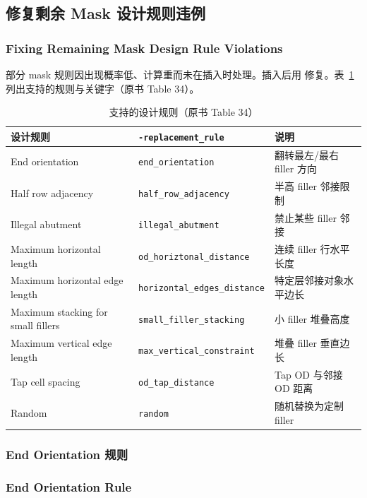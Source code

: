 \subsection{修复剩余 Mask 设计规则违例}
\subsubsection*{Fixing Remaining Mask Design Rule Violations}

部分 mask 规则因出现概率低、计算重而未在插入时处理。插入后用  修复。表~\ref{tab:replace-fillers-rules} 列出支持的规则与关键字（原书 Table 34）。

\begin{table}[htbp]
\centering
\caption{ 支持的设计规则（原书 Table 34）}
\label{tab:replace-fillers-rules}
\begin{tabular}{@{}llp{}@{}}
\toprule
设计规则 & \texttt{-replacement\_rule} & 说明 \\
\midrule
End orientation & \texttt{end\_orientation} & 翻转最左/最右 filler 方向 \\
Half row adjacency & \texttt{half\_row\_adjacency} & 半高 filler 邻接限制 \\
Illegal abutment & \texttt{illegal\_abutment} & 禁止某些 filler 邻接 \\
Maximum horizontal length & \texttt{od\_horiztonal\_distance} & 连续 filler 行水平长度 \\
Maximum horizontal edge length & \texttt{horizontal\_edges\_distance} & 特定层邻接对象水平边长 \\
Maximum stacking for small fillers & \texttt{small\_filler\_stacking} & 小 filler 堆叠高度 \\
Maximum vertical edge length & \texttt{max\_vertical\_constraint} & 堆叠 filler 垂直边长 \\
Tap cell spacing & \texttt{od\_tap\_distance} & Tap OD 与邻接 OD 距离 \\
Random & \texttt{random} & 随机替换为定制 filler \\
\bottomrule
\end{tabular}
\end{table}

\subsubsection{End Orientation 规则}
\subsubsection*{End Orientation Rule}

